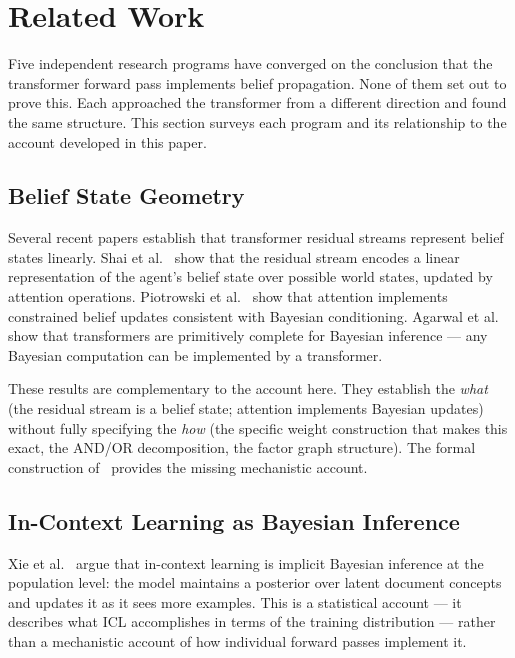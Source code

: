 \section{Related Work}
\label{sec:related-work}

Five independent research programs have converged on the conclusion that the
transformer forward pass implements belief propagation. None of them set out to
prove this. Each approached the transformer from a different direction and found
the same structure. This section surveys each program and its relationship to
the account developed in this paper.

\subsection*{Belief State Geometry}

Several recent papers establish that transformer residual streams represent belief
states linearly. Shai et al.~\cite{shai2024belief} show that the residual stream
encodes a linear representation of the agent's belief state over possible world
states, updated by attention operations. Piotrowski et
al.~\cite{piotrowski2025constrained} show that attention implements constrained
belief updates consistent with Bayesian conditioning. Agarwal et
al.~\cite{agarwal2025bayesian} show that transformers are primitively complete for
Bayesian inference --- any Bayesian computation can be implemented by a transformer.

These results are complementary to the account here. They establish the
\emph{what} (the residual stream is a belief state; attention implements Bayesian
updates) without fully specifying the \emph{how} (the specific weight construction
that makes this exact, the AND/OR decomposition, the factor graph structure). The
formal construction of~\cite{coppola2026transformers} provides the missing
mechanistic account.

\subsection*{In-Context Learning as Bayesian Inference}

Xie et al.~\cite{xie2022icl} argue that in-context learning is implicit Bayesian
inference at the population level: the model maintains a posterior over latent
document concepts and updates it as it sees more examples. This is a statistical
account --- it describes what ICL accomplishes in terms of the training distribution
--- rather than a mechanistic account of how individual forward passes implement it.

